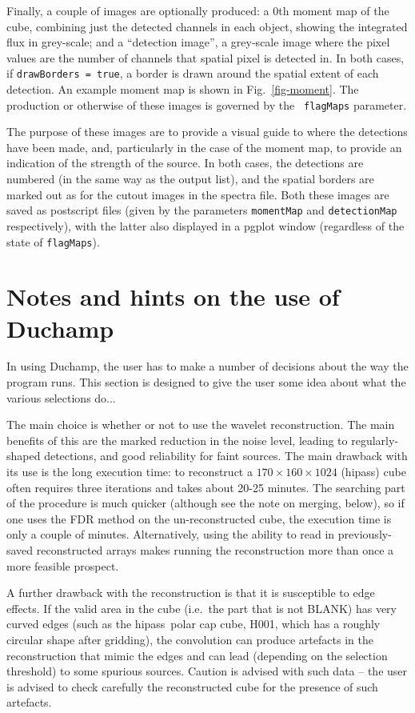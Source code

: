 \documentclass[12pt,a4paper]{article}
\newcommand{\ie}{i.e.\ }
\newcommand{\hipass}{{\sc hipass}}
\begin{document}
Finally, a couple of images are optionally produced: a 0th moment map
of the cube, combining just the detected channels in each object,
showing the integrated flux in grey-scale; and a ``detection image'',
a grey-scale image where the pixel values are the number of channels
that spatial pixel is detected in. In both cases, if {\tt drawBorders =
true}, a border is drawn around the spatial extent of each
detection. An example moment map is shown in Fig.~\ref{fig-moment}.
The production or otherwise of these images is governed by the {\tt
flagMaps} parameter.

The purpose of these images are to provide a visual guide to where the
detections have been made, and, particularly in the case of the moment
map, to provide an indication of the strength of the source. In both
cases, the detections are numbered (in the same way as the output
list), and the spatial borders are marked out as for the cutout images
in the spectra file. Both these images are saved as postscript files
(given by the parameters {\tt momentMap} and {\tt detectionMap}
respectively), with the latter also displayed in a {\sc pgplot}
window (regardless of the state of {\tt flagMaps}).

\section{Notes and hints on the use of Duchamp}

In using Duchamp, the user has to make a number of decisions about
the way the program runs. This section is designed to give the user
some idea about what the various selections do...

The main choice is whether or not to use the wavelet
reconstruction. The main benefits of this are the marked reduction in
the noise level, leading to regularly-shaped detections, and good
reliability for faint sources. The main drawback with its use is the
long execution time: to reconstruct a $170\times160\times1024$
(\hipass) cube often requires three iterations and takes about 20-25
minutes. The searching part of the procedure is much quicker (although
see the note on merging, below), so if one uses the FDR method on the
un-reconstructed cube, the execution time is only a couple of
minutes. Alternatively, using the ability to read in previously-saved
reconstructed arrays makes running the reconstruction more than once a
more feasible prospect.

A further drawback with the reconstruction is that it is susceptible
to edge effects. If the valid area in the cube (\ie the part that is
not BLANK) has very curved edges (such as the \hipass\ polar cap cube,
H001, which has a roughly circular shape after gridding), the
convolution can produce artefacts in the reconstruction that mimic the
edges and can lead (depending on the selection threshold) to some
spurious sources. Caution is advised with such data -- the user is
advised to check carefully the reconstructed cube for the presence of
such artefacts.
\end{document}
